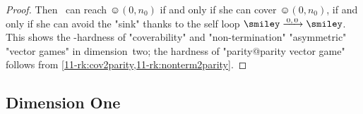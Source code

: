 \begin{proof}
  Then \Eve\ can reach $\smiley(0,n_0)$ if and only if she can cover
  $\smiley(0,n_0)$, if and only if she can avoid the "sink" thanks to
  the self loop $\smiley\step{0,0}\smiley$.  This
  shows the \EXP-hardness of "coverability" and "non-termination"
  "asymmetric" "vector games" in dimension~two; the hardness of
  "parity@parity vector game" follows
  from \cref{11-rk:cov2parity,11-rk:nonterm2parity}.
\end{proof}

  
\subsection{Dimension One}
\label{11-sec:mono-dim1}
%
